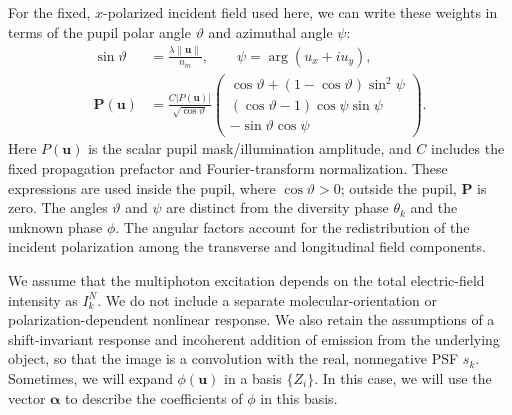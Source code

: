 \documentclass{article}
\begin{document}
For the fixed, $x$-polarized incident field used here, we can write these weights in terms of the pupil polar angle $\vartheta$ and azimuthal angle $\psi$:
\begin{align}
\sin\vartheta &= \frac{\lambda\|\mathbf{u}\|}{n_m},
\qquad \psi = \arg(u_x+i u_y), \\
\mathbf{P}(\mathbf{u}) &= \frac{C|P(\mathbf{u})|}{\sqrt{\cos\vartheta}}
\begin{pmatrix}
\cos\vartheta+(1-\cos\vartheta)\sin^2\psi \\
(\cos\vartheta-1)\cos\psi\sin\psi \\
-\sin\vartheta\cos\psi
\end{pmatrix}.
\end{align}
Here $P(\mathbf{u})$ is the scalar pupil mask/illumination amplitude, and $C$ includes the fixed propagation prefactor and Fourier-transform normalization. These expressions are used inside the pupil, where $\cos\vartheta>0$; outside the pupil, $\mathbf{P}$ is zero. The angles $\vartheta$ and $\psi$ are distinct from the diversity phase $\theta_k$ and the unknown phase $\phi$. The angular factors account for the redistribution of the incident polarization among the transverse and longitudinal field components.

We assume that the multiphoton excitation depends on the total electric-field intensity as $I_k^N$. We do not include a separate molecular-orientation or polarization-dependent nonlinear response. We also retain the assumptions of a shift-invariant response and incoherent addition of emission from the underlying object, so that the image is a convolution with the real, nonnegative PSF $s_k$.
Sometimes, we will expand $\phi(\mathbf{u})$ in a basis $\{ Z_i\}$. In this case, we will use the vector $\bm{\alpha}$ to describe the coefficients of $\phi$ in this basis.
\end{document}
